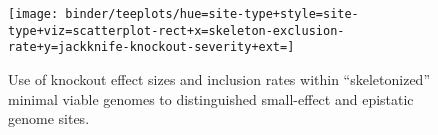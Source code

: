 \begin{figure}
  \centering
  \footnotesize
  \texttt{[image: binder/teeplots/hue=site-type+style=site-type+viz=scatterplot-rect+x=skeleton-exclusion-rate+y=jackknife-knockout-severity+ext=]}
  \vspace{-0.25in}
  \caption{%
    Use of knockout effect sizes and inclusion rates within ``skeletonized'' minimal viable genomes to distinguished small-effect and epistatic genome sites.
  }
  \label{fig:epistatic}
  \vspace{-0.25in}
\end{figure}
